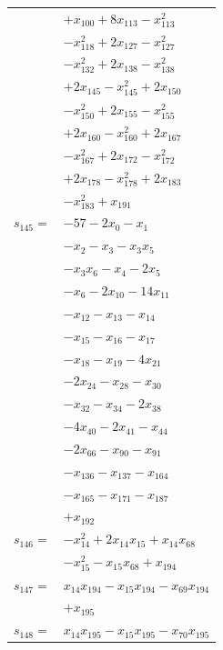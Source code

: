 \begin{longtable}{@{}r@{\;}l@{}}
 & \(\displaystyle +x_{100} +8x_{113} -x_{113}^{2}\) \\
 & \(\displaystyle -x_{118}^{2} +2x_{127} -x_{127}^{2}\) \\
 & \(\displaystyle -x_{132}^{2} +2x_{138} -x_{138}^{2}\) \\
 & \(\displaystyle +2x_{145} -x_{145}^{2} +2x_{150}\) \\
 & \(\displaystyle -x_{150}^{2} +2x_{155} -x_{155}^{2}\) \\
 & \(\displaystyle +2x_{160} -x_{160}^{2} +2x_{167}\) \\
 & \(\displaystyle -x_{167}^{2} +2x_{172} -x_{172}^{2}\) \\
 & \(\displaystyle +2x_{178} -x_{178}^{2} +2x_{183}\) \\
 & \(\displaystyle -x_{183}^{2} +x_{191}\) \\[3pt]
\(s_{145}=\) & \(\displaystyle -57 -2x_{0} -x_{1}\) \\
 & \(\displaystyle -x_{2} -x_{3} -x_{3}x_{5}\) \\
 & \(\displaystyle -x_{3}x_{6} -x_{4} -2x_{5}\) \\
 & \(\displaystyle -x_{6} -2x_{10} -14x_{11}\) \\
 & \(\displaystyle -x_{12} -x_{13} -x_{14}\) \\
 & \(\displaystyle -x_{15} -x_{16} -x_{17}\) \\
 & \(\displaystyle -x_{18} -x_{19} -4x_{21}\) \\
 & \(\displaystyle -2x_{24} -x_{28} -x_{30}\) \\
 & \(\displaystyle -x_{32} -x_{34} -2x_{38}\) \\
 & \(\displaystyle -4x_{40} -2x_{41} -x_{44}\) \\
 & \(\displaystyle -2x_{66} -x_{90} -x_{91}\) \\
 & \(\displaystyle -x_{136} -x_{137} -x_{164}\) \\
 & \(\displaystyle -x_{165} -x_{171} -x_{187}\) \\
 & \(\displaystyle +x_{192}\) \\[3pt]
\(s_{146}=\) & \(\displaystyle -x_{14}^{2} +2x_{14}x_{15} +x_{14}x_{68}\) \\
 & \(\displaystyle -x_{15}^{2} -x_{15}x_{68} +x_{194}\) \\[3pt]
\(s_{147}=\) & \(\displaystyle x_{14}x_{194} -x_{15}x_{194} -x_{69}x_{194}\) \\
 & \(\displaystyle +x_{195}\) \\[3pt]
\(s_{148}=\) & \(\displaystyle x_{14}x_{195} -x_{15}x_{195} -x_{70}x_{195}\) \\

\end{longtable}
